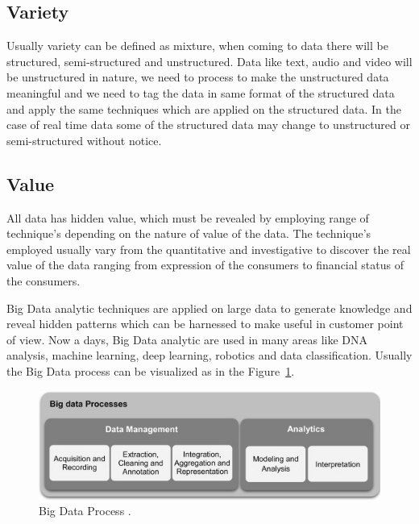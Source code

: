 \documentclass[sigconf]{acmart}
\begin{document}
\subsection{Variety}

Usually variety can be defined as mixture, when coming to data there will be structured, semi-structured and unstructured. Data like text, audio and video will be unstructured in nature, we need to process to make the unstructured data meaningful and we need to tag the data in same format of the structured data and apply the same techniques which are applied on the structured data. In the case of real time data some of the structured data may change to unstructured or semi-structured without notice.

\subsection{Value}

All data has hidden value, which must be revealed by employing range of technique's depending on the nature of value of the data. The technique's employed usually vary from the quantitative and investigative to discover the real value of the data ranging from expression of the consumers to financial status of the consumers.


Big Data analytic techniques are applied on large data to generate knowledge and reveal hidden patterns which can be harnessed to make useful in customer point of view. Now a days, Big Data analytic are used in many areas like DNA analysis, machine learning, deep learning, robotics and data classification. Usually the Big Data process can be visualized as in the Figure~\ref{fig:BD}.


\begin{figure}
\includegraphics[width=1.0\columnwidth]{Capture1}
\caption{Big Data Process \cite{bigdata}.}
\label{fig:BD}
\end{figure}
\end{document}
